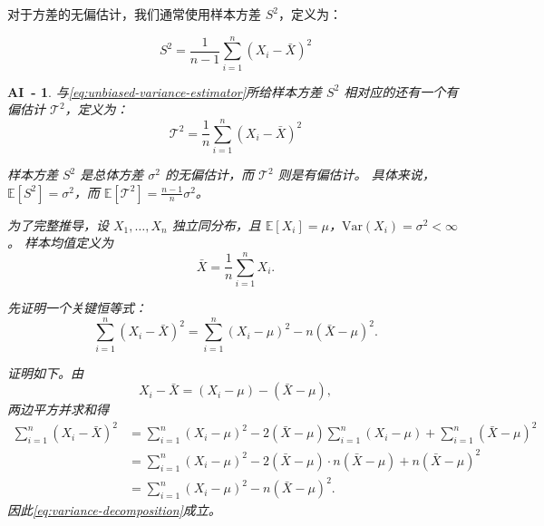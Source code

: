 \documentclass[a4paper]{ctexart}
\newtheorem{AI}{AI~-}
\begin{document}
对于方差的无偏估计，我们通常使用样本方差 $S^2$，定义为：

\begin{equation}
    S^2 = \frac{1}{n-1} \sum_{i=1}^{n} {(X_i - \bar{X})}^2
    \label{eq:unbiased-variance-estimator}
\end{equation}

\begin{AI}
    与\eqref{eq:unbiased-variance-estimator}所给样本方差 $S^2$ 相对应的还有一个有偏估计 $\mathcal{T}^2$，定义为：
    \begin{equation}
        \mathcal{T}^2 = \frac{1}{n} \sum_{i=1}^{n} {(X_i - \bar{X})}^2
        \label{eq:biased-variance-estimator}
    \end{equation}

    样本方差 $S^2$ 是总体方差 $\sigma^2$ 的无偏估计，而 $\mathcal{T}^2$ 则是有偏估计。
    具体来说，$\mathbb{E}[S^2] = \sigma^2$，而 $\mathbb{E}[\mathcal{T}^2] = \frac{n-1}{n} \sigma^2$。

    为了完整推导，设 $X_1,\dots,X_n$ 独立同分布，且
    $\mathbb{E}[X_i]=\mu$，$\mathrm{Var}(X_i)=\sigma^2<\infty$。
    样本均值定义为
    \begin{equation}
        \bar{X}=\frac{1}{n}\sum_{i=1}^{n}X_i.
    \end{equation}

    先证明一个关键恒等式：
    \begin{equation}
        \sum_{i=1}^{n}{(X_i-\bar{X})}^2
        = \sum_{i=1}^{n}{(X_i-\mu)}^2 - n{(\bar{X}-\mu)}^2.
        \label{eq:variance-decomposition}
    \end{equation}

    证明如下。由
    \begin{equation}
        X_i-\bar{X}=(X_i-\mu)-(\bar{X}-\mu),
    \end{equation}
    两边平方并求和得
    \begin{equation}
        \begin{split}
            \sum_{i=1}^{n}{(X_i-\bar{X})}^2
             & = \sum_{i=1}^{n}{(X_i-\mu)}^2
            -2(\bar{X}-\mu)\sum_{i=1}^{n}(X_i-\mu)
            +\sum_{i=1}^{n}{(\bar{X}-\mu)}^2                       \\
             & = \sum_{i=1}^{n}{(X_i-\mu)}^2
            -2(\bar{X}-\mu)\cdot n(\bar{X}-\mu)
            +n{(\bar{X}-\mu)}^2                                    \\
             & = \sum_{i=1}^{n}{(X_i-\mu)}^2 - n{(\bar{X}-\mu)}^2.
        \end{split}
    \end{equation}
    因此\eqref{eq:variance-decomposition}成立。


\end{AI}
\end{document}
